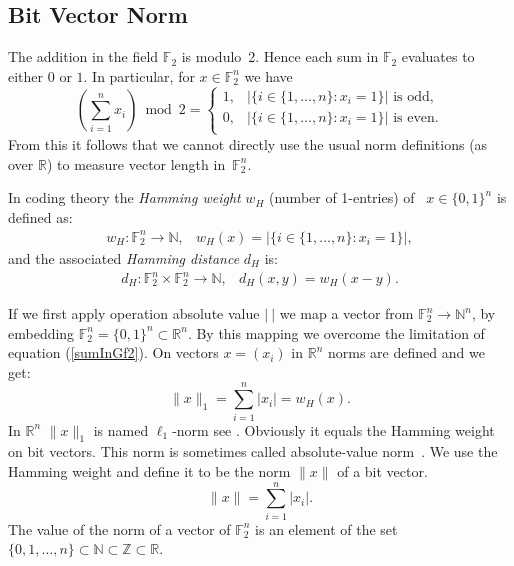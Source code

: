 \documentclass[a4paper]{article}
\newcommand{\BF}{\mathbb{F}}
\newcommand{\BN}{\mathbb{N}}
\newcommand{\BR}{\mathbb{R}}
\newcommand{\BZ}{\mathbb{Z}}
\newcommand{\0}{\mathbf{0}}
\newcommand{\1}{\mathbf{1}}
\begin{document}
\subsection{Bit Vector Norm}
The addition in the field $\BF_2$ is modulo~2. Hence each sum in $\BF_2$ evaluates to either $0$ or $1$.
In particular, for $x \in \BF_2^n$ we have
\begin{equation}
	\left( \sum_{i=1}^n x_i \right)\bmod 2 = \left\{
	\begin{array}{ll}
		1, & | \{i \in \{1, \dots, n\} : x_i = 1\}| \text{ is odd},  \\
		0, & | \{i \in \{1, \dots, n\} : x_i = 1\}| \text{ is even}.  \\
	\end{array}
	\right.
	\label{sumInGf2}
\end{equation}
From this it follows that we cannot directly use the usual norm definitions (as over $\BR$) to measure vector length in~$\BF_2^n$.

In coding theory \cite{Hamming1950, wikipedia_en_2025_HammingWeight} the {\em Hamming weight} $w_H$ (number of 1-entries)
of~ $x \in \{0, 1\}^n$ is defined as:
\begin{equation}
\begin{array}{ll}
w_H : \BF_2^n \rightarrow \BN, & w_H(x) = | \{i \in \{1, \dots, n\} : x_i = 1\}|,
\end{array}
\end{equation}
and the associated {\em Hamming distance} $d_H$ is:
\begin{equation}
\begin{array}{ll}
d_H : \BF_2^n \times \BF_2^n \rightarrow \BN, & d_H(x, y) = w_H(x - y).
\end{array}
\end{equation}

If we first apply operation absolute value $| \  |$ we map a vector from $\BF_2^n \to \BN^n$,
by embedding $\BF_2^n = \{0, 1\}^n \subset \BR^n$. By this mapping we overcome the limitation of equation
(\ref{sumInGf2}).
On vectors $x = (x_i)$ in $\BR^n$ norms are defined
and we get:
\begin{equation}
\| x \|_1 = \sum_{i=1}^n | x_i | = w_H(x).
\end{equation}
In $\BR^n$ $\| x \|_1$ is named $\ell_1$-norm see \cite{Forster2016_Analysis_1, Mathworld2025:L1-Norm}.
Obviously it equals the Hamming weight on bit vectors.
This norm is sometimes called absolute-value
norm~\cite{wikipedia_en_2025_NormMathematics}.
We use the Hamming weight and define it to be the norm $\| x\| $ of a bit vector.
\begin{equation}
\| x \| = \sum_{i=1}^n | x_i |.
\label{def:norm}
\end{equation}
The value of the norm of a vector of $\BF_2^n$ is an element of the set $\{0, 1, \dots, n\} \subset \BN \subset \BZ \subset \BR$.
\end{document}
